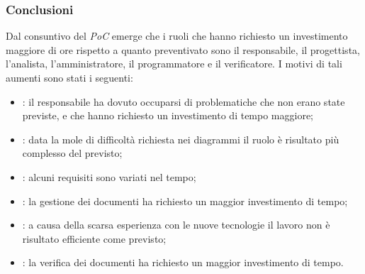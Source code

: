 \subsubsection{Conclusioni}
Dal consuntivo del \textit{PoC} emerge che i ruoli che hanno richiesto un investimento maggiore di ore rispetto a quanto preventivato sono il responsabile, il progettista, l'analista, l'amministratore, il programmatore e il verificatore. I motivi di tali aumenti sono stati i seguenti:
\begin{itemize}
    \item \roleProjectManager: il responsabile ha dovuto occuparsi di problematiche che non erano state previste, e che hanno richiesto un investimento di tempo maggiore;
    \item \roleDesigner: data la mole di difficoltà richiesta nei diagrammi il ruolo è risultato più complesso del previsto;
    \item \roleAnalyst: alcuni requisiti sono variati nel tempo;
    \item \roleAdministrator: la gestione dei documenti ha richiesto un maggior investimento di tempo;
    \item \roleProgrammer: a causa della scarsa esperienza con le nuove tecnologie il lavoro non è risultato efficiente come previsto;
    \item \roleVerifier: la verifica dei documenti ha richiesto un maggior investimento di tempo.
\end{itemize}